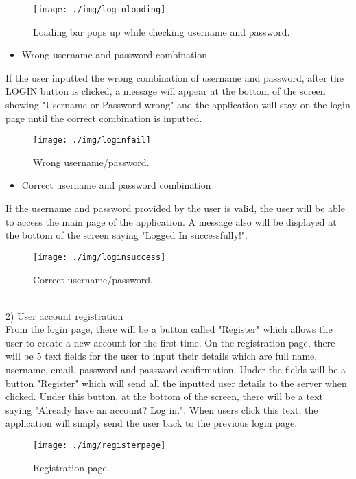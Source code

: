 \documentclass[conference]{IEEEtran}
\begin{document}
\begin{figure}[h!]
\texttt{[image: ./img/loginloading]}
\centering
\caption{Loading bar pops up while checking username and password.}
\end{figure}

\begin{itemize}
\item Wrong username and password combination
\end{itemize}
If the user inputted the wrong combination of username and password, after the LOGIN button is clicked, a message will appear at the bottom of the screen showing "Username or Password wrong" and the application will stay on the login page until the correct combination is inputted.

\begin{figure}[h!]
\texttt{[image: ./img/loginfail]}
\centering
\caption{Wrong username/password.}
\end{figure}

\begin{itemize}
\item Correct username and password combination
\end{itemize}
If the username and password provided by the user is valid, the user will be able to access the main page of the application. A message also will be displayed at the bottom of the screen saying "Logged In successfully!".

\begin{figure}[h!]
\texttt{[image: ./img/loginsuccess]}
\centering
\caption{Correct username/password.}
\end{figure}

\\2) User account registration\\
From the login page, there will be a button called "Register" which allows the user to create a new account for the first time. On the registration page, there will be 5 text fields for the user to input their details which are full name, username, email, password and password confirmation. Under the fields will be a button "Register" which will send all the inputted user details to the server when clicked. Under this button, at the bottom of the screen, there will be a text saying "Already have an account? Log in.". When users click this text, the application will simply send the user back to the previous login page.

\begin{figure}[h!]
\texttt{[image: ./img/registerpage]}
\centering
\caption{Registration page.}
\end{figure}
\end{document}

